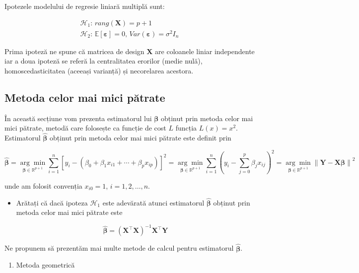 \documentclass[]{article}
\providecommand{\tightlist}{%
  \setlength{\itemsep}{0pt}\setlength{\parskip}{0pt}}
\newenvironment{frshaded*}{%
  \def\FrameCommand{\fboxrule=\FrameRule\fboxsep=\FrameSep \fcolorbox{framecolor}{shadecolor1}}%
  \MakeFramed {\advance\hsize-\width \FrameRestore}}%
{\endMakeFramed}
\newenvironment{rmdblock}[1]
  {\begin{frshaded*}
  \begin{itemize}
  \renewcommand{\labelitemi}{
    \raisebox{-.7\height}[0pt][0pt]{
      {\setkeys{Gin}{width=2em,keepaspectratio}\texttt{[image: images/icons/\#1]}}
    }
  }
  \item
  }
  {
  \end{itemize}
  \end{frshaded*}
  }
\newenvironment{rmdexercise}
  {\begin{rmdblock}{exercise}}
  {\end{rmdblock}}
\begin{document}
Ipotezele modelului de regresie liniară multiplă sunt:

\[
  \begin{array}{ll}
    \mathcal{H}_1: \, rang(\boldsymbol X) = p+1\\
    \mathcal{H}_2: \, \mathbb{E}[\boldsymbol \varepsilon] = 0,\, Var(\boldsymbol \varepsilon) = \sigma^2 I_n
  \end{array}
\]

Prima ipoteză ne spune că matricea de design \(\boldsymbol X\) are
coloanele liniar independente iar a doua ipoteză se referă la
centralitatea erorilor (medie nulă), homoscedasticitatea (aceeași
varianță) și necorelarea acestora.

\subsection{Metoda celor mai mici
pătrate}\label{metoda-celor-mai-mici-patrate}

În această secțiune vom prezenta estimatorul lui \(\boldsymbol \beta\)
obținut prin metoda celor mai mici pătrate, metodă care folosește ca
funcție de cost \(L\) funcția \(L(x) = x^2\). Estimatorul
\(\hat{\boldsymbol \beta}\) obținut prin metoda celor mai mici pătrate
este definit prin

\[
  \hat{\boldsymbol \beta} = \underset{\boldsymbol\beta\in\mathbb{R}^{p+1}}{\arg\min}\sum_{i = 1}^{n}\left[y_i - \left(\beta_0 + \beta_1 x_{i1} + \cdots + \beta_p x_{ip}\right)\right]^2 = \underset{\boldsymbol\beta\in\mathbb{R}^{p+1}}{\arg\min}\sum_{i = 1}^{n}\left(y_i - \sum_{j= 0}^{p}\beta_j x_{ij}\right)^2 = \underset{\boldsymbol\beta\in\mathbb{R}^{p+1}}{\arg\min}\left\lVert \boldsymbol Y - \boldsymbol X \boldsymbol\beta\right\rVert^2
\]

unde am folosit convenția \(x_{i0} = 1\), \(i = 1,2,\ldots,n\).

\begin{rmdexercise}
Arătați că dacă ipoteza \(\mathcal{H}_1\) este adevărată atunci
estimatorul \(\hat{\boldsymbol \beta}\) obținut prin metoda celor mai
mici pătrate este

\[
  \hat{\boldsymbol \beta} = (\boldsymbol{X}^\intercal \boldsymbol X)^{-1}\boldsymbol{X}^\intercal \boldsymbol Y
\]
\end{rmdexercise}

Ne propunem să prezentăm mai multe metode de calcul pentru estimatorul
\(\hat{\boldsymbol \beta}\).

\begin{enumerate}
\def\labelenumi{\alph{enumi})}
\tightlist
\item
  Metoda geometrică
\end{enumerate}
\end{document}
